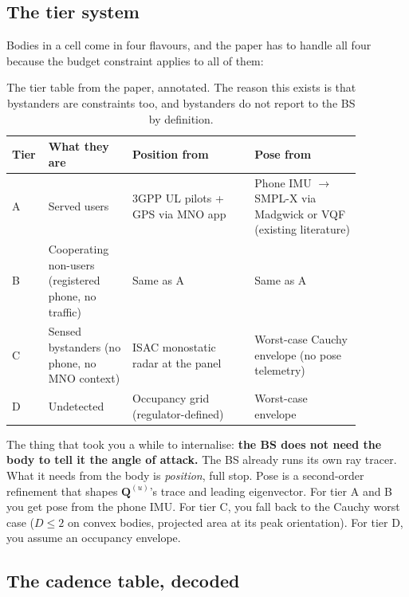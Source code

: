 \documentclass[11pt]{article}
\newcommand{\Qmat}{\mathbf{Q}}
\begin{document}
\subsection{The tier system}

Bodies in a cell come in four flavours, and the paper has to handle
all four because the budget constraint applies to all of them:

\begin{table}[!h]
\centering
\small
\begin{tabular}{@{}p{0.05\linewidth}p{0.22\linewidth}p{0.32\linewidth}p{0.28\linewidth}@{}}
\toprule
Tier & What they are & Position from & Pose from \\
\midrule
A & Served users & 3GPP UL pilots + GPS via MNO app & Phone IMU $\to$ SMPL-X via Madgwick or VQF (existing literature) \\
B & Cooperating non-users (registered phone, no traffic) & Same as A & Same as A \\
C & Sensed bystanders (no phone, no MNO context) & ISAC monostatic radar at the panel & Worst-case Cauchy envelope (no pose telemetry) \\
D & Undetected & Occupancy grid (regulator-defined) & Worst-case envelope \\
\bottomrule
\end{tabular}
\caption{The tier table from the paper, annotated. The reason this
exists is that bystanders are constraints too, and bystanders do not
report to the BS by definition.}
\end{table}

The thing that took you a while to internalise: \textbf{the BS does
not need the body to tell it the angle of attack.} The BS already
runs its own ray tracer. What it needs from the body is
\emph{position}, full stop. Pose is a second-order refinement that
shapes $\Qmat^{(u)}$'s trace and leading eigenvector. For tier A and
B you get pose from the phone IMU. For tier C, you fall back to the
Cauchy worst case ($D \leq 2$ on convex bodies, projected area at
its peak orientation). For tier D, you assume an occupancy envelope.

\subsection{The cadence table, decoded}
\end{document}
